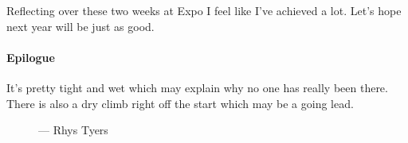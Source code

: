 Reflecting over these two weeks at Expo I feel like I’ve achieved a lot. Let’s hope next year will be just as good.

\paragraph{Epilogue}  It’s pretty tight and wet which may explain why no one has really been there. There is also a dry climb right off the start which may be a going lead. 

\begin{figure}[h!]
      \checkoddpage \ifoddpage \forcerectofloat \else \forceversofloat \fi
      \centering
       \label{Panorama}
  \caption{ --- Rhys Tyers}
\end{figure}

